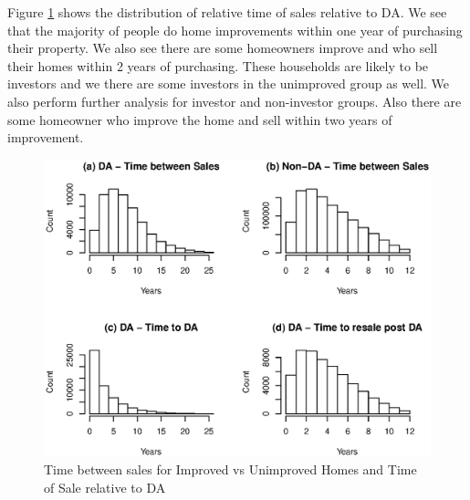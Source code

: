 \documentclass{article}
\begin{document}
Figure \ref{fig:Rplot_month_bet_sale_notional} shows the distribution of relative time of sales relative to DA. We see that the majority of people do home improvements within one year of purchasing their property. We also see there are some homeowners improve and who sell their homes within 2 years of purchasing. These households are likely to be investors and we there are some investors in the unimproved group as well. We also perform further analysis for investor and non-investor groups. Also there are some homeowner who improve the home and sell within two years of improvement. 

\begin{figure}[!ht]
    \centering
     \includegraphics[width=\columnwidth]{Figures/Rplot_time_bet_sales_notional2004.eps} \par
 \caption{Time between sales for Improved vs Unimproved Homes and Time of Sale relative to DA}
 \label{fig:Rplot_month_bet_sale_notional}
\end{figure}
\end{document}
